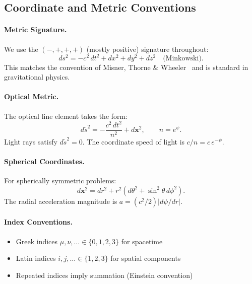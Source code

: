 \subsection{Coordinate and Metric Conventions}\label{app:coordinates}

\paragraph{Metric Signature.}
We use the $(-,+,+,+)$ (mostly positive) signature throughout:
\begin{equation}
ds^2 = -c^2\,dt^2 + dx^2 + dy^2 + dz^2 \quad \text{(Minkowski)}.
\end{equation}
This matches the convention of Misner, Thorne \& Wheeler~\cite{MTW} and is 
standard in gravitational physics.

\paragraph{Optical Metric.}
The optical line element takes the form:
\begin{equation}
d\tilde{s}^2 = -\frac{c^2\,dt^2}{n^2} + d\mathbf{x}^2, \qquad n = e^\psi.
\end{equation}
Light rays satisfy $d\tilde{s}^2 = 0$. The coordinate speed of light is 
$c/n = c\,e^{-\psi}$.

\paragraph{Spherical Coordinates.}
For spherically symmetric problems:
\begin{equation}
d\mathbf{x}^2 = dr^2 + r^2(d\theta^2 + \sin^2\theta\,d\phi^2).
\end{equation}
The radial acceleration magnitude is $a = (c^2/2)|d\psi/dr|$.

\paragraph{Index Conventions.}
\begin{itemize}
\item Greek indices $\mu, \nu, \ldots \in \{0,1,2,3\}$ for spacetime
\item Latin indices $i, j, \ldots \in \{1,2,3\}$ for spatial components
\item Repeated indices imply summation (Einstein convention)
\end{itemize}

